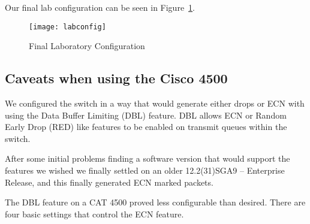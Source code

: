 \documentclass[12pt]{article}
\begin{document}

Our final lab configuration can be seen in Figure~\ref{fig:labconfig}.

\begin{figure}[!h]
\centering
\texttt{[image: labconfig]}
\caption{Final Laboratory Configuration }
\label{fig:labconfig}
\end{figure}



\subsection{Caveats when using the Cisco 4500}

We configured the switch in a way that would generate either drops
or ECN with using the Data Buffer Limiting (DBL) feature. DBL allows ECN or Random Early
Drop (RED) like features to be enabled on transmit queues within the switch.

After some initial problems finding a software version that would
support the features we wished we finally settled on an older
12.2(31)SGA9 -- Enterprise Release, and this finally generated
ECN marked packets.

The DBL feature on a CAT 4500 proved less configurable than desired. There are four
basic settings that control the ECN feature. 
\end{document}
